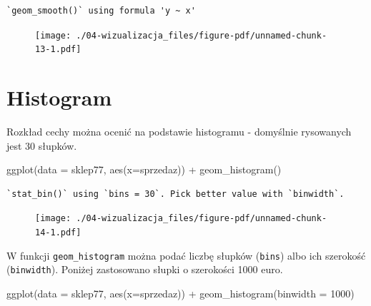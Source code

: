 \documentclass[
  letterpaper,
  DIV=11,
  numbers=noendperiod]{scrreprt}
\newenvironment{Shaded}{\begin{snugshade}}{\end{snugshade}}
\newcommand{\AttributeTok}[1]{\textcolor[rgb]{0.40,0.45,0.13}{#1}}
\newcommand{\DecValTok}[1]{\textcolor[rgb]{0.68,0.00,0.00}{#1}}
\newcommand{\FunctionTok}[1]{\textcolor[rgb]{0.28,0.35,0.67}{#1}}
\newcommand{\NormalTok}[1]{\textcolor[rgb]{0.00,0.23,0.31}{#1}}
\newcommand{\SpecialCharTok}[1]{\textcolor[rgb]{0.37,0.37,0.37}{#1}}
\begin{document}
\begin{verbatim}
`geom_smooth()` using formula 'y ~ x'
\end{verbatim}

\begin{figure}[H]

{\centering \texttt{[image: ./04-wizualizacja\_files/figure-pdf/unnamed-chunk-13-1.pdf]}

}

\end{figure}

\hypertarget{histogram}{%
\section{Histogram}\label{histogram}}

Rozkład cechy można ocenić na podstawie histogramu - domyślnie
rysowanych jest 30 słupków.

\begin{Shaded}
\begin{Highlighting}[]
\FunctionTok{ggplot}\NormalTok{(}\AttributeTok{data =}\NormalTok{ sklep77, }\FunctionTok{aes}\NormalTok{(}\AttributeTok{x=}\NormalTok{sprzedaz)) }\SpecialCharTok{+}
  \FunctionTok{geom\_histogram}\NormalTok{()}
\end{Highlighting}
\end{Shaded}

\begin{verbatim}
`stat_bin()` using `bins = 30`. Pick better value with `binwidth`.
\end{verbatim}

\begin{figure}[H]

{\centering \texttt{[image: ./04-wizualizacja\_files/figure-pdf/unnamed-chunk-14-1.pdf]}

}

\end{figure}

W funkcji \texttt{geom\_histogram} można podać liczbę słupków
(\texttt{bins}) albo ich szerokość (\texttt{binwidth}). Poniżej
zastosowano słupki o szerokości 1000 euro.

\begin{Shaded}
\begin{Highlighting}[]
\FunctionTok{ggplot}\NormalTok{(}\AttributeTok{data =}\NormalTok{ sklep77, }\FunctionTok{aes}\NormalTok{(}\AttributeTok{x=}\NormalTok{sprzedaz)) }\SpecialCharTok{+}
  \FunctionTok{geom\_histogram}\NormalTok{(}\AttributeTok{binwidth =} \DecValTok{1000}\NormalTok{)}
\end{Highlighting}
\end{Shaded}
\end{document}
